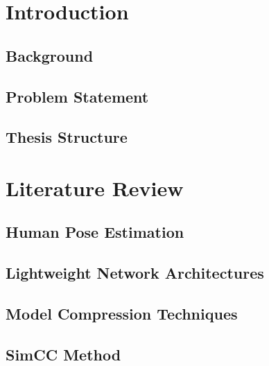 \documentclass[a4paper,12pt]{article}
\begin{document}
\pagestyle{main}
\clearpage
\section{Introduction}
\subsection{Background}


\subsection{Problem Statement}


\subsection{Thesis Structure}


\section{Literature Review}
\subsection{Human Pose Estimation}


\subsection{Lightweight Network Architectures}


\subsection{Model Compression Techniques}


\subsection{SimCC Method}


\end{document}
